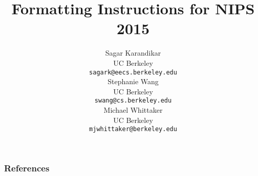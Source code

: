 \documentclass{article}
\title{Formatting Instructions for NIPS 2015}
\author{%
  Sagar Karandikar \\
  UC Berkeley\\
  \texttt{sagark@eecs.berkeley.edu} \\
  \And{}
  Stephanie Wang \\
  UC Berkeley\\
  \texttt{swang@cs.berkeley.edu} \\
  \And{}
  Michael Whittaker \\
  UC Berkeley \\
  \texttt{mjwhittaker@berkeley.edu} \\
}
\begin{document}
\maketitle

{}
{}
{}
{}
{}
{}
{}

\subsubsection*{References}


\end{document}
